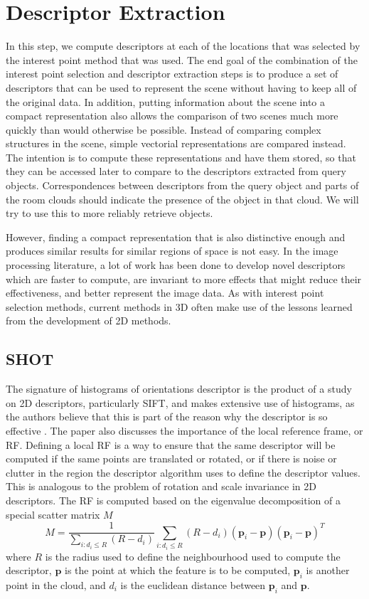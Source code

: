 \documentclass[11pt,a4paper]{kth-mag}
\begin{document}
\section{Descriptor Extraction}
In this step, we compute descriptors at each of the locations that was selected
by the interest point method that was used. The end goal of the combination of
the interest point selection and descriptor extraction steps is to produce a set
of descriptors that can be used to represent the scene without having to keep
all of the original data. In addition, putting information about the scene into
a compact representation also allows the comparison of two scenes much more
quickly than would otherwise be possible. Instead of comparing complex
structures in the scene, simple vectorial representations are compared instead.
The intention is to compute these representations and have them stored, so that
they can be accessed later to compare to the descriptors extracted from query
objects. Correspondences between descriptors from the query object and parts of
the room clouds should indicate the presence of the object in that cloud. We
will try to use this to more reliably retrieve objects.

However, finding a compact representation that is also distinctive enough and
produces similar results for similar regions of space is not easy. In the image
processing literature, a lot of work has been done to develop novel descriptors
which are faster to compute, are invariant to more effects that might reduce
their effectiveness, and better represent the image data. As with interest point
selection methods, current methods in 3D often make use of the lessons learned
from the development of 2D methods. 

\subsection{SHOT}
The signature of histograms of orientations descriptor is the product of a study
on 2D descriptors, particularly SIFT, and makes extensive use of histograms, as
the authors believe that this is part of the reason why the descriptor is so
effective \cite{tombari2010unique}. The paper also discusses the importance of
the local reference frame, or RF. Defining a local RF is a way to ensure that
the same descriptor will be computed if the same points are translated or
rotated, or if there is noise or clutter in the region the descriptor algorithm
uses to define the descriptor values. This is analogous to the problem of
rotation and scale invariance in 2D descriptors. The RF is computed based on the
eigenvalue decomposition of a special scatter matrix $M$
\begin{equation}
  \label{eq:12}
  M=\frac{1}{\sum_{i:d_i\leq R}(R-d_i)}\sum_{i:d_i\leq R}(R-d_i)(\mathbf{p}_i-\mathbf{p})(\mathbf{p}_i-\mathbf{p})^T
\end{equation}
where $R$ is the radius used to define the neighbourhood used to compute the
descriptor, $\mathbf{p}$ is the point at which the feature is to be computed,
$\mathbf{p}_i$ is another point in the cloud, and $d_i$ is the euclidean
distance between $\mathbf{p}_i$ and $\mathbf{p}$.
\end{document}
